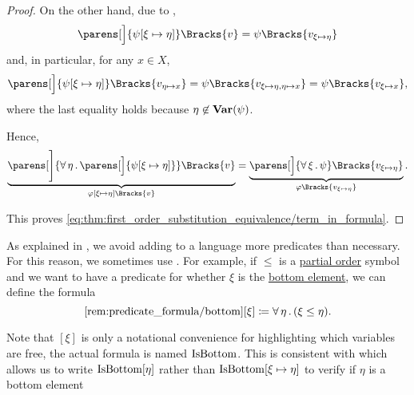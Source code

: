 \begin{proof}
  On the other hand, due to ,
  \begin{equation*}
    \parens[\Big]{ \psi[\xi \mapsto \eta] }\Bracks{v} = \psi\Bracks{v_{\xi \mapsto \eta}}
  \end{equation*}
  and, in particular, for any \( x \in X \),
  \begin{equation*}
    \parens[\Big]{ \psi[\xi \mapsto \eta] }\Bracks{v_{\eta \mapsto x}}
    =
    \psi\Bracks{v_{\xi \mapsto \eta,\eta \mapsto x}}
    =
    \psi\Bracks{v_{\xi \mapsto x}},
  \end{equation*}
  where the last equality holds because \( \eta \not\in \operatorname{\mathbf{Var}}(\psi) \).

  Hence,
  \begin{equation*}
    \underbrace{ \parens[\Bigg]{\qforall \eta \parens[\Big]{ \psi[\xi \mapsto \eta] } }\Bracks{v} }_{\varphi[\xi \mapsto \eta]\Bracks{v}}
    =
    \underbrace{ \parens[\Big]{\qforall \xi \psi }\Bracks{v_{\xi \mapsto \eta}} }_{\varphi\Bracks{v_{\xi \mapsto \eta}}}.
  \end{equation*}

  This proves \eqref{eq:thm:first_order_substitution_equivalence/term_in_formula}.
\end{proof}

\begin{remark}\label{rem:predicate_formula}
  As explained in , we avoid adding to a language more predicates than necessary. For this reason, we sometimes use . For example, if \( \leq \) is a \hyperref[def:partially_ordered_set/theory]{partial order} symbol and we want to have a predicate for whether \( \xi \) is the \hyperref[def:partially_ordered_set_extremal_points/top_and_bottom]{bottom element}, we can define the formula
  \begin{equation}\taglabel[\op{IsBottom}]{rem:predicate_formula/bottom}
    \ref{rem:predicate_formula/bottom}[\xi] \coloneqq \qforall \eta (\xi \leq \eta).
  \end{equation}

  Note that \( [\xi] \) is only a notational convenience for highlighting which variables are free, the actual formula is named \( \operatorname{IsBottom} \). This is consistent with  which allows us to write \( \operatorname{IsBottom}[\eta] \) rather than \( \operatorname{IsBottom}[\xi \mapsto \eta] \) to verify if \( \eta \) is a bottom element
\end{remark}

